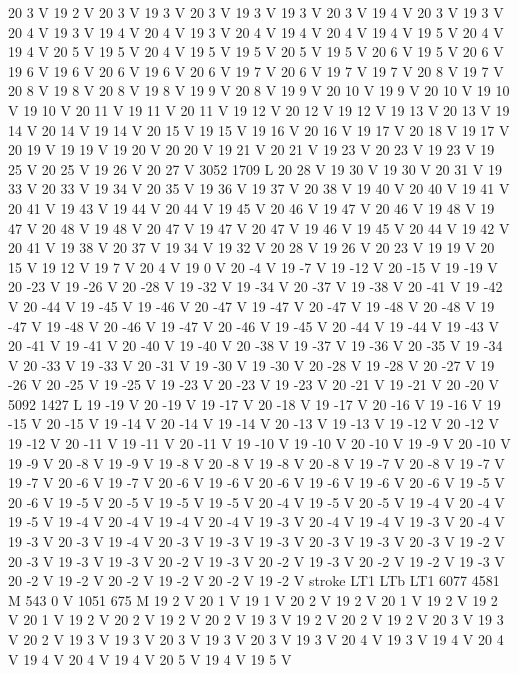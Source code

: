 {{20 3 V
19 2 V
20 3 V
19 3 V
20 3 V
19 3 V
19 3 V
20 3 V
19 4 V
20 3 V
19 3 V
20 4 V
19 3 V
19 4 V
20 4 V
19 3 V
20 4 V
19 4 V
20 4 V
19 4 V
19 5 V
20 4 V
19 4 V
20 5 V
19 5 V
20 4 V
19 5 V
19 5 V
20 5 V
19 5 V
20 6 V
19 5 V
20 6 V
19 6 V
19 6 V
20 6 V
19 6 V
20 6 V
19 7 V
20 6 V
19 7 V
19 7 V
20 8 V
19 7 V
20 8 V
19 8 V
20 8 V
19 8 V
19 9 V
20 8 V
19 9 V
20 10 V
19 9 V
20 10 V
19 10 V
19 10 V
20 11 V
19 11 V
20 11 V
19 12 V
20 12 V
19 12 V
19 13 V
20 13 V
19 14 V
20 14 V
19 14 V
20 15 V
19 15 V
19 16 V
20 16 V
19 17 V
20 18 V
19 17 V
20 19 V
19 19 V
19 20 V
20 20 V
19 21 V
20 21 V
19 23 V
20 23 V
19 23 V
19 25 V
20 25 V
19 26 V
20 27 V
3052 1709 L
20 28 V
19 30 V
19 30 V
20 31 V
19 33 V
20 33 V
19 34 V
20 35 V
19 36 V
19 37 V
20 38 V
19 40 V
20 40 V
19 41 V
20 41 V
19 43 V
19 44 V
20 44 V
19 45 V
20 46 V
19 47 V
20 46 V
19 48 V
19 47 V
20 48 V
19 48 V
20 47 V
19 47 V
20 47 V
19 46 V
19 45 V
20 44 V
19 42 V
20 41 V
19 38 V
20 37 V
19 34 V
19 32 V
20 28 V
19 26 V
20 23 V
19 19 V
20 15 V
19 12 V
19 7 V
20 4 V
19 0 V
20 -4 V
19 -7 V
19 -12 V
20 -15 V
19 -19 V
20 -23 V
19 -26 V
20 -28 V
19 -32 V
19 -34 V
20 -37 V
19 -38 V
20 -41 V
19 -42 V
20 -44 V
19 -45 V
19 -46 V
20 -47 V
19 -47 V
20 -47 V
19 -48 V
20 -48 V
19 -47 V
19 -48 V
20 -46 V
19 -47 V
20 -46 V
19 -45 V
20 -44 V
19 -44 V
19 -43 V
20 -41 V
19 -41 V
20 -40 V
19 -40 V
20 -38 V
19 -37 V
19 -36 V
20 -35 V
19 -34 V
20 -33 V
19 -33 V
20 -31 V
19 -30 V
19 -30 V
20 -28 V
19 -28 V
20 -27 V
19 -26 V
20 -25 V
19 -25 V
19 -23 V
20 -23 V
19 -23 V
20 -21 V
19 -21 V
20 -20 V
5092 1427 L
19 -19 V
20 -19 V
19 -17 V
20 -18 V
19 -17 V
20 -16 V
19 -16 V
19 -15 V
20 -15 V
19 -14 V
20 -14 V
19 -14 V
20 -13 V
19 -13 V
19 -12 V
20 -12 V
19 -12 V
20 -11 V
19 -11 V
20 -11 V
19 -10 V
19 -10 V
20 -10 V
19 -9 V
20 -10 V
19 -9 V
20 -8 V
19 -9 V
19 -8 V
20 -8 V
19 -8 V
20 -8 V
19 -7 V
20 -8 V
19 -7 V
19 -7 V
20 -6 V
19 -7 V
20 -6 V
19 -6 V
20 -6 V
19 -6 V
19 -6 V
20 -6 V
19 -5 V
20 -6 V
19 -5 V
20 -5 V
19 -5 V
19 -5 V
20 -4 V
19 -5 V
20 -5 V
19 -4 V
20 -4 V
19 -5 V
19 -4 V
20 -4 V
19 -4 V
20 -4 V
19 -3 V
20 -4 V
19 -4 V
19 -3 V
20 -4 V
19 -3 V
20 -3 V
19 -4 V
20 -3 V
19 -3 V
19 -3 V
20 -3 V
19 -3 V
20 -3 V
19 -2 V
20 -3 V
19 -3 V
19 -3 V
20 -2 V
19 -3 V
20 -2 V
19 -3 V
20 -2 V
19 -2 V
19 -3 V
20 -2 V
19 -2 V
20 -2 V
19 -2 V
20 -2 V
19 -2 V
stroke
LT1
LTb
LT1
6077 4581 M
543 0 V
1051 675 M
19 2 V
20 1 V
19 1 V
20 2 V
19 2 V
20 1 V
19 2 V
19 2 V
20 1 V
19 2 V
20 2 V
19 2 V
20 2 V
19 3 V
19 2 V
20 2 V
19 2 V
20 3 V
19 3 V
20 2 V
19 3 V
19 3 V
20 3 V
19 3 V
20 3 V
19 3 V
20 4 V
19 3 V
19 4 V
20 4 V
19 4 V
20 4 V
19 4 V
20 5 V
19 4 V
19 5 V
}}

